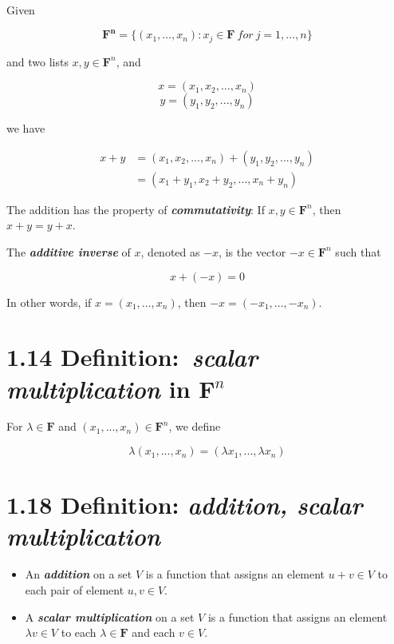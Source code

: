 \documentclass[12pt, letterpaper, oneside]{book}
\begin{document}
Given

\[
  \mathbf{F^n} = \{(x_1, ..., x_n): x_j \in \mathbf{F} \ for \ j = 1, ..., n\}
\]

and two lists $x, y \in \mathbf{F}^n$, and

\[
  x = (x_1, x_2, ..., x_n)
\]
\[
  y = (y_1, y_2, ..., y_n)
\]

we have

\begin{equation*}
\begin{split}
  x + y &= (x_1, x_2, ..., x_n) + (y_1, y_2, ..., y_n) \\
        &= (x_1 + y_1, x_2 + y_2, ..., x_n + y_n)
\end{split}
\end{equation*}

The addition has the property of \textbf{\textit{commutativity}}: If $x, y \in
\mathbf{F}^n$, then $x + y = y + x$.

The \textbf{\textit{additive inverse}} of $x$, denoted as $-x$, is the vector
$-x \in \mathbf{F}^n$ such that

\[
  x + (-x) = 0
\]

In other words, if $x = (x_1, ..., x_n)$, then $-x = (-x_1, ..., -x_n)$.

\section{1.14 Definition:\
  \textbf{\textit{scalar multiplication}} in $\mathbf{F}^n$}

For $\lambda \in \mathbf{F}$ and $(x_1, ..., x_n) \in \mathbf{F}^n$, we define

\[
  \lambda(x_1, ..., x_n) = (\lambda x_1, ..., \lambda x_n)
\]

\section{1.18 Definition: \it{addition}, \it{scalar multiplication}}

\begin{itemize}
  \item An \textbf{\textit{addition}} on a set $V$ is a function that assigns
    an element $u+v \in V$ to each pair of element $u, v \in V$.
  \item A \textbf{\textit{scalar multiplication}} on a set $V$ is a function
    that assigns an element $\lambda v \in V$ to each $\lambda \in \mathbf{F}$
    and each $v \in V$.
\end{itemize}
\end{document}
